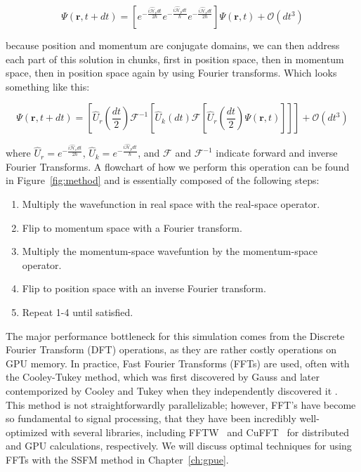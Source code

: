 $$
\Psi(\mathbf{r},t+dt) = \left[e^{-\frac{i\mathcal{\hat{H}}_vdt}{2\hbar}}e^{-\frac{i\mathcal{\hat{H}}_pdt}{\hbar}}e^{-\frac{i\mathcal{\hat{H}}_vdt}{2\hbar}} \right]\Psi(\mathbf{r},t) + \mathcal{O}(dt^3)
$$

\noindent because position and momentum are conjugate domains, we can then address each part of this solution in chunks, first in position space, then in momentum space, then in position space again by using Fourier transforms.
Which looks something like this:

$$
\Psi(\mathbf{r}, t+dt) = \left[\hat{U}_r\left(\frac{dt}{2}\right)\mathcal{F}^{-1}\left[\hat{U}_k(dt) \mathcal{F} \left[\hat{U}_r\left(\frac{dt}{2}\right) \Psi(\mathbf{r},t) \right] \right] \right] + \mathcal{O}(dt^3)
$$

where $\hat{U}_r = e^{-\frac{i\mathcal{\hat{H}}_vdt}{2\hbar}}$, $\hat{U}_k = e^{-\frac{i\mathcal{\hat{H}}_pdt}{\hbar}}$, and $\mathcal{F}$ and $\mathcal{F}^{-1}$ indicate forward and inverse Fourier Transforms.
A flowchart of how we perform this operation can be found in Figure~\ref{fig:method} and is essentially composed of the following steps:

\begin{enumerate}
\item Multiply the wavefunction in real space with the real-space operator.
\item Flip to momentum space with a Fourier transform.
\item Multiply the momentum-space wavefuntion by the momentum-space operator.
\item Flip to position space with an inverse Fourier transform.
\item Repeat 1-4 until satisfied.
\end{enumerate}

The major performance bottleneck for this simulation comes from the Discrete Fourier Transform (DFT) operations, as they are rather costly operations on GPU memory.
In practice, Fast Fourier Transforms (FFTs) are used, often with the Cooley-Tukey method, which was first discovered by Gauss and later contemporized by Cooley and Tukey when they independently discovered it \cite{cooley1965}.
This method is not straightforwardly parallelizable; however, FFT's have become so fundamental to signal processing, that they have been incredibly well-optimized with several libraries, including FFTW~\cite{frigo1998} and CuFFT~\cite{fatica2008} for distributed and GPU calculations, respectively.
We will discuss optimal techniques for using FFTs with the SSFM method in Chapter~\ref{ch:gpue}.

